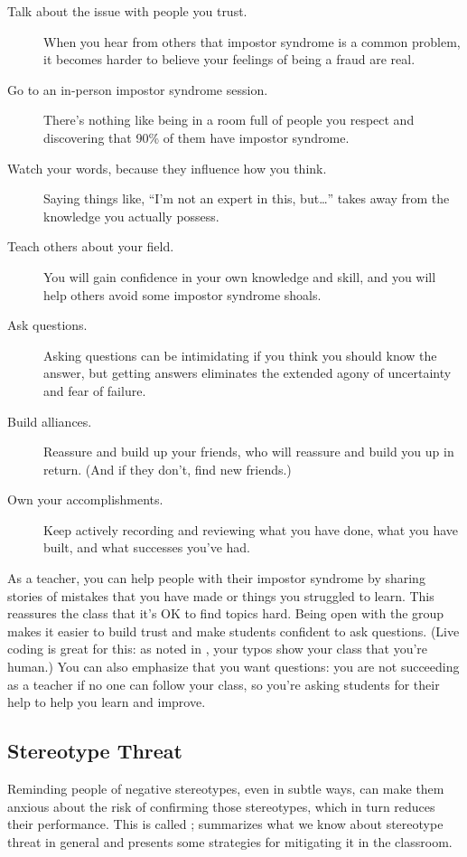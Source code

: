 \begin{description}
\item[Talk about the issue with people you trust.]
When you hear from others that impostor syndrome is a common
problem, it becomes harder to believe your feelings of being a fraud
are real.
\item[Go to an in-person impostor syndrome session.]
There's nothing like being in a room full of people you respect and
discovering that 90\% of them have impostor syndrome.
\item[Watch your words, because they influence how you think.]
Saying things like, ``I'm not an expert in this, but{\ldots}''
takes away from the knowledge you actually possess.
\item[Teach others about your field.]
You will gain confidence in your own knowledge and skill, and you
will help others avoid some impostor syndrome shoals.
\item[Ask questions.]
Asking questions can be intimidating if you think you should know
the answer, but getting answers eliminates the extended agony of
uncertainty and fear of failure.
\item[Build alliances.]
Reassure and build up your friends, who will reassure and build you
up in return. (And if they don't, find new friends.)
\item[Own your accomplishments.]
Keep actively recording and reviewing what you have done, what you
have built, and what successes you've had.
\end{description}

As a teacher, you can help people with their impostor syndrome by
sharing stories of mistakes that you have made or things you struggled
to learn. This reassures the class that it's OK to find topics hard.
Being open with the group makes it easier to build trust and make
students confident to ask questions. (Live coding is great for this: as
noted in , your typos show your class
that you're human.) You can also emphasize that you want questions: you
are not succeeding as a teacher if no one can follow your class, so
you're asking students for their help to help you learn and improve.

\subsection*{Stereotype Threat}

Reminding people of negative stereotypes, even in subtle ways, can make
them anxious about the risk of confirming those stereotypes, which in
turn reduces their performance. This is called
; \cite{Stee2011}
summarizes what we know about stereotype threat in general and presents
some strategies for mitigating it in the classroom.

